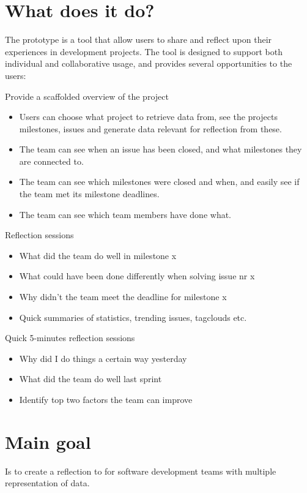 \section{What does it do?}
The prototype is a tool that allow users to share and reflect upon their experiences in development projects. The tool is designed to support both individual and collaborative usage, and provides several opportunities to the users:
\begin{description}

	\item{Provide a scaffolded overview of the project} 
	\begin{itemize}
	\item Users can choose what project to retrieve data from, see the projects milestones, issues and generate data relevant for reflection from these.
	\item The team can see when an issue has been closed, and what milestones they are connected to.
	\item The team can see which milestones were closed and when, and easily see if the team met its milestone deadlines. 
	\item The team can see which team members have done what.
	\end{itemize}

	\item {Reflection sessions} 
	\begin{itemize}
	\item What did the team do well in milestone x
	\item What could have been done differently when solving issue nr x
	\item Why didn't the team meet the deadline for milestone x
	\item Quick summaries of statistics, trending issues, tagclouds etc.
	\end{itemize}

	\item {Quick 5-minutes reflection sessions} 
	\begin{itemize}
	\item Why did I do things a certain way yesterday
	\item What did the team do well last sprint
	\item Identify top two factors the team can improve
	\end{itemize}
\end{description}

\section{Main goal}
Is to create a reflection to for software development teams with multiple representation of data. %

